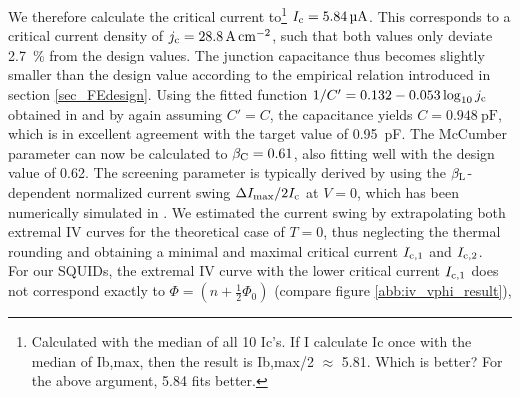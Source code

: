
We therefore calculate the critical current to\footnote{Calculated with the median of all 10 Ic's. If I calculate Ic once with the median of Ib,max, then the result is Ib,max/2 $\approx$ 5.81. Which is better? For the above argument, 5.84 fits better.} $I_{\rm c}=\qty{5.84}{\micro\ampere}$. This corresponds to a critical current density of $j_{\rm c}=\qty{28.8}{\ampere\per\centi\meter\squared}$, such that both values only deviate \qty{2.7}{\percent} from the design values. The junction capacitance thus becomes slightly smaller than the design value according to the empirical relation introduced in section \ref{sec_FEdesign}. Using the fitted function $1/C'=0.132-0.053\log_{10}j_{\rm c}$ obtained in \cite{Bauer2022} and by again assuming $C'=C$, the capacitance yields $C=\qty{0.948}{\pico\farad}$, which is in excellent agreement with the target value of \qty{0.95}{\pico\farad}. The McCumber parameter can now be calculated to $\beta_{\rm C}=0.61$, also fitting well with the design value of 0.62. The screening parameter is typically derived by using the $\beta_{\rm L}$-dependent normalized current swing $\Delta I_{\rm max}/2I_{\rm c}$ at $V=0$, which has been numerically simulated in \cite{Tesche1977}. We estimated the current swing by extrapolating both extremal IV curves for the theoretical case of $T=0$, thus neglecting the thermal rounding and obtaining a minimal and maximal critical current $I_{\rm c,1}$ and $I_{\rm c,2}$. \\ For our SQUIDs, the extremal IV curve with the lower critical current $I_{\rm c,1}$ does not correspond exactly to $\Phi = (n+\frac{1}{2}\Phi_0)$ (compare figure \ref{abb:iv_vphi_result}), 
